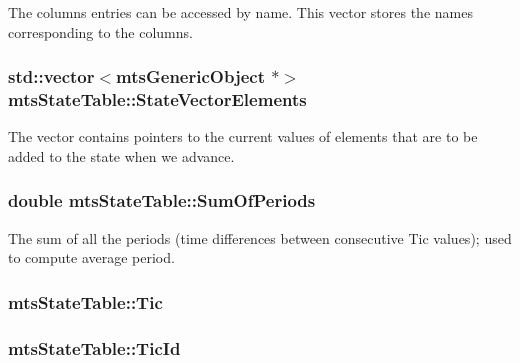 The columns entries can be accessed by name. This vector stores the names corresponding to the columns. \hypertarget{classmts_state_table_a9752b943b66ae808210cff3fde497be3}{
\subsubsection[{State\-Vector\-Elements}]{\setlength{\rightskip}{0pt plus 5cm}std\-::vector$<${\bf mts\-Generic\-Object} $\ast$$>$ mts\-State\-Table\-::\-State\-Vector\-Elements\hspace{0.3cm}{\ttfamily [protected]}}}\label{classmts_state_table_a9752b943b66ae808210cff3fde497be3}
The vector contains pointers to the current values of elements that are to be added to the state when we advance. \hypertarget{classmts_state_table_a57adbe08f57772500f8066c64ad5b49b}{
\subsubsection[{Sum\-Of\-Periods}]{\setlength{\rightskip}{0pt plus 5cm}double mts\-State\-Table\-::\-Sum\-Of\-Periods\hspace{0.3cm}{\ttfamily [protected]}}}\label{classmts_state_table_a57adbe08f57772500f8066c64ad5b49b}
The sum of all the periods (time differences between consecutive Tic values); used to compute average period. \hypertarget{classmts_state_table_ae4b2244609f4ec292d183d1daeeaf994}{
\subsubsection[{Tic}]{ mts\-State\-Table\-::\-Tic}}\label{classmts_state_table_ae4b2244609f4ec292d183d1daeeaf994}
\hypertarget{classmts_state_table_abf08ee55060e6fcc154161cec9a18fc1}{
\subsubsection[{Tic\-Id}]{ mts\-State\-Table\-::\-Tic\-Id\hspace{0.3cm}{\ttfamily [protected]}}}\label{classmts_state_table_abf08ee55060e6fcc154161cec9a18fc1}
